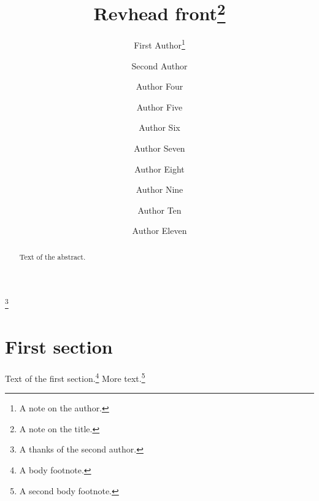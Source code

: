 \documentclass{revtex4-2}
\begin{document}
\title{Revhead front\thanks{A note on the title.}}
\author{First Author\footnote{A note on the author.}}
\author{Second Author}
\thanks{A thanks of the second author.}
\author{Author Four}
\author{Author Five}
\author{Author Six}
\author{Author Seven}
\author{Author Eight}
\author{Author Nine}
\author{Author Ten}
\author{Author Eleven}
\begin{abstract}
Text of the abstract.
\end{abstract}
\maketitle
\section{First section}
Text of the first section.\footnote{A body footnote.}
More text.\footnote{A second body footnote.}
\end{document}
